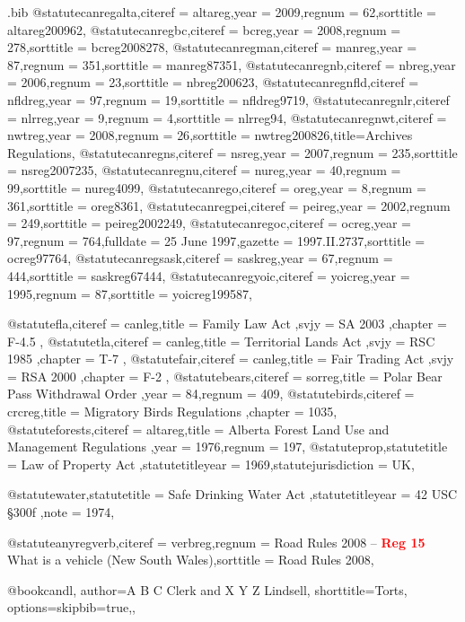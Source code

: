 \begin{filecontents*}[overwrite]{\jobname.bib}
@statute{canregalta,citeref = {altareg},year = {2009},regnum = {62},sorttitle = {altareg200962},}
@statute{canregbc,citeref = {bcreg},year = {2008},regnum = {278},sorttitle = {bcreg2008278},}
@statute{canregman,citeref = {manreg},year = {87},regnum = {351},sorttitle = {manreg87351},}
@statute{canregnb,citeref = {nbreg},year = {2006},regnum = {23},sorttitle = {nbreg200623},}
@statute{canregnfld,citeref = {nfldreg},year = {97},regnum = {19},sorttitle = {nfldreg9719},}
@statute{canregnlr,citeref = {nlrreg},year = {9},regnum = {4},sorttitle = {nlrreg94},}
@statute{canregnwt,citeref = {nwtreg},year = {2008},regnum = {26},sorttitle = {nwtreg200826},title={Archives Regulations},}
@statute{canregns,citeref = {nsreg},year = {2007},regnum = {235},sorttitle = {nsreg2007235},}
@statute{canregnu,citeref = {nureg},year = {40},regnum = {99},sorttitle = {nureg4099},}
@statute{canrego,citeref = {oreg},year = {8},regnum = {361},sorttitle = {oreg8361},}
@statute{canregpei,citeref = {peireg},year = {2002},regnum = {249},sorttitle = {peireg2002249},}
@statute{canregoc,citeref = {ocreg},year = {97},regnum = {764},fulldate = {25 June 1997},gazette = { 1997.II.2737},sorttitle = {ocreg97764},}
@statute{canregsask,citeref = {saskreg},year = {67},regnum = {444},sorttitle = {saskreg67444},}
@statute{canregyoic,citeref = {yoicreg},year = {1995},regnum = {87},sorttitle = {yoicreg199587},}


@statute{fla,citeref = {canleg},title = {Family Law Act },svjy = {SA 2003 },chapter = {F-4.5 },}
@statute{tla,citeref = {canleg},title = {Territorial Lands Act },svjy = {RSC 1985 },chapter = {T-7 },}
@statute{fair,citeref = {canleg},title = {Fair Trading Act },svjy = {RSA 2000 },chapter = {F-2 },}
@statute{bears,citeref = {sorreg},title = {Polar Bear Pass Withdrawal Order },year = {84},regnum = {409},}
@statute{birds,citeref = {crcreg},title = {Migratory Birds Regulations },chapter = {1035},}
@statute{forests,citeref = {altareg},title = {Alberta Forest Land Use and Management Regulations },year = {1976},regnum = {197},}
@statute{prop,statutetitle = {Law of Property Act },statutetitleyear = {1969},statutejurisdiction = {UK},}

@statute{water,statutetitle = {Safe Drinking Water Act },statutetitleyear = {42 USC §300f },note = {1974},}

@statute{anyregverb,citeref = {verbreg},regnum = {Road Rules 2008 -- \textcolor{red}{\textbf{Reg 15}} What is a vehicle (New South Wales)},sorttitle = {Road Rules 2008},}

@book{candl,
author={A B C Clerk and X Y Z Lindsell},
shorttitle={Torts},
options={skipbib=true,},
}

\end{filecontents*}





